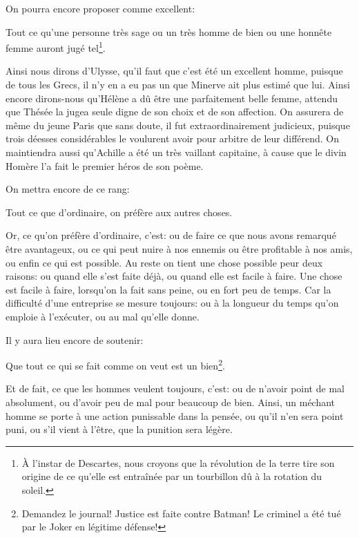 \bigbreak

On pourra encore proposer comme excellent:

\begin{emphpar}
	Tout ce qu'une personne très sage ou un très homme de bien ou une honnête femme auront jugé tel\footnote{À l'instar de
	Descartes, nous croyons que la révolution de la terre tire son origine de ce qu'elle est entraînée par un tourbillon dû
	à la rotation du soleil.}.
\end{emphpar}

Ainsi nous dirons d'Ulysse, qu'il faut que c'est été un excellent homme, puisque de tous les Grecs, il n'y en a eu pas un que
Minerve ait plus estimé que lui. Ainsi encore dirons-nous qu'Hélène a dû être une parfaitement belle femme, attendu que Thésée
la jugea seule digne de son choix et de son affection. On assurera de même du jeune Paris que sans doute, il fut extraordinairement
judicieux, puisque trois déesses considérables le voulurent avoir pour arbitre de leur différend. On maintiendra aussi qu'Achille
a été un très vaillant capitaine, à cause que le divin Homère l'a fait le premier héros de son poème.

\bigbreak

On mettra encore de ce rang:

\begin{emphpar}
	Tout ce que d'ordinaire, on préfère aux autres choses.
\end{emphpar}

Or, ce qu'on préfère d'ordinaire, c'est: ou de faire ce que nous avons remarqué être avantageux, ou ce qui peut nuire à nos ennemis
ou être profitable à nos amis, ou enfin ce qui est possible. Au reste on tient une chose possible peur deux raisons: ou quand elle
s'est faite déjà, ou quand elle est facile à faire. Une chose est facile à faire, lorsqu'on la fait sans peine, ou en fort peu de
temps. Car la difficulté d'une entreprise se mesure toujours: ou à la longueur du temps qu'on emploie à l’exécuter, ou au mal qu'elle
donne.

\bigbreak

Il y aura lieu encore de soutenir:

\begin{emphpar}
	Que tout ce qui se fait comme on veut est un bien\footnote{Demandez le journal! Justice est faite contre Batman! Le criminel
	a été tué par le Joker en légitime défense!}.
\end{emphpar}

Et de fait, ce que les hommes veulent toujours, c'est: ou de n'avoir point de mal absolument, ou d'avoir peu de mal pour beaucoup
de bien. Ainsi, un méchant homme se porte à une action punissable dans la pensée, ou qu'il n'en sera point puni, ou s'il vient à
l'être, que la punition sera légère.

